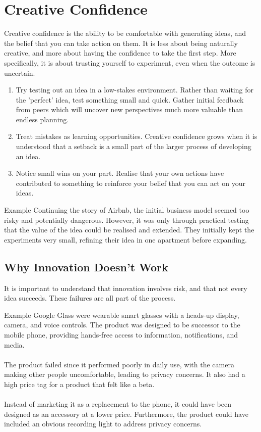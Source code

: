 \documentclass{report}
\begin{document}
	\section{Creative Confidence}

		Creative confidence is the ability to be comfortable with generating ideas, and the belief that you can take action on them. It is less about being naturally creative, and more about having the confidence to take the first step. More specifically, it is about trusting yourself to experiment, even when the outcome is uncertain.

		\begin{enumerate}
			\item Try testing out an idea in a low-stakes environment. Rather than waiting for the 'perfect' idea, test something small and quick. Gather initial feedback from peers which will uncover new perspectives much more valuable than endless planning.
			\item Treat mistakes as learning opportunities. Creative confidence grows when it is understood that a setback is a small part of the larger process of developing an idea.
			\item Notice small wins on your part. Realise that your own actions have contributed to something to reinforce your belief that you can act on your ideas.
		\end{enumerate}

		\begin{question}{Example}
			Continuing the story of Airbnb, the initial business model seemed too risky and potentially dangerous. However, it was only through practical testing that the value of the idea could be realised and extended. They initially kept the experiments very small, refining their idea in one apartment before expanding.
		\end{question}

		\subsection{Why Innovation Doesn't Work}

			It is important to understand that innovation involves risk, and that not every idea succeeds. These failures are all part of the process.

			\begin{question}{Example}
				Google Glass were wearable smart glasses with a heads-up display, camera, and voice controls. The product was designed to be successor to the mobile phone, providing hands-free access to information, notifications, and media.
				\\ \\
				The product failed since it performed poorly in daily use, with the camera making other people uncomfortable, leading to privacy concerns. It also had a high price tag for a product that felt like a beta.
				\\ \\
				Instead of marketing it as a replacement to the phone, it could have been designed as an accessory at a lower price. Furthermore, the product could have included an obvious recording light to address privacy concerns.
			\end{question}
\end{document}
